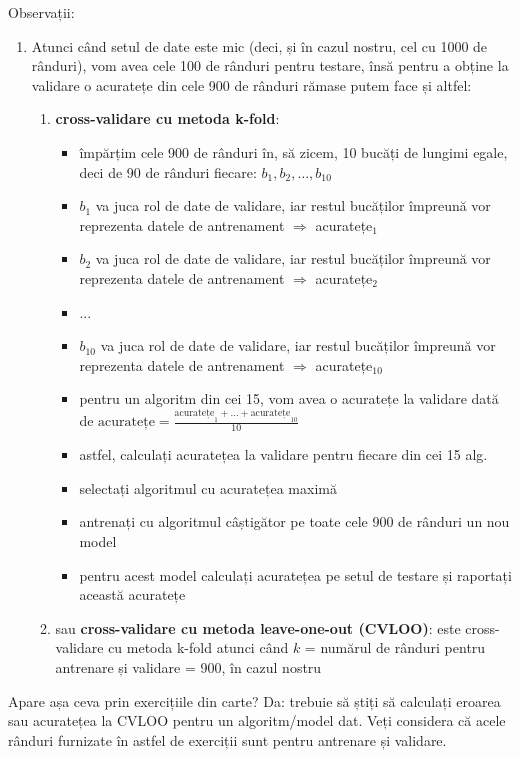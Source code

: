 \documentclass[12pt]{article}
\begin{document}
\begin{enumerate}
\begin{enumerate}
			Observații:
			\begin{enumerate}
				\item Atunci când setul de date este mic (deci, și în cazul nostru, cel cu 1000 de rânduri), vom avea cele 100 de rânduri pentru testare, însă pentru a obține la validare o acuratețe din cele 900 de rânduri rămase putem face și altfel:
				\begin{enumerate}
					\item \textbf{cross-validare cu metoda k-fold}:
						\begin{itemize}
							\item împărțim cele 900 de rânduri în, să zicem, 10 bucăți de lungimi egale, deci de 90 de rânduri fiecare: $b_1,b_2,\dots,b_{10}$
							\item $b_1$ va juca rol de date de validare, iar restul bucăților împreună vor reprezenta datele de antrenament $\Rightarrow$ acuratețe$_1$
							\item $b_2$ va juca rol de date de validare, iar restul bucăților împreună vor reprezenta datele de antrenament $\Rightarrow$ acuratețe$_2$
							\item ...
							\item $b_{10}$ va juca rol de date de validare, iar restul bucăților împreună vor reprezenta datele de antrenament $\Rightarrow$ acuratețe$_{10}$
							\item pentru un algoritm din cei 15, vom avea o acuratețe la validare dată de $\text{acuratețe} = \frac{\text{acuratețe}_1+\dots+\text{acuratețe}_{10}}{10}$
							\item astfel, calculați acuratețea la validare pentru fiecare din cei 15 alg.
							\item selectați algoritmul cu acuratețea maximă
							\item antrenați cu algoritmul câștigător pe toate cele 900 de rânduri un nou model
							\item pentru acest model calculați acuratețea pe setul de testare și raportați această acuratețe
						\end{itemize}
					\item sau \textbf{cross-validare cu metoda leave-one-out (CVLOO)}: este cross-validare cu metoda k-fold atunci când $k$ = numărul de rânduri pentru antrenare și validare = 900, în cazul nostru
				\end{enumerate}
			\end{enumerate}
		\end{enumerate}
	\end{enumerate}
	Apare așa ceva prin exercițiile din carte? Da: trebuie să știți să calculați eroarea sau acuratețea la CVLOO pentru un algoritm/model dat. Veți considera că acele rânduri furnizate în astfel de exerciții sunt pentru antrenare și validare.
	
\end{document}
